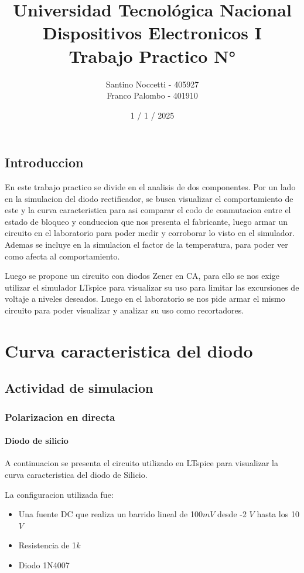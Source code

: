 \documentclass[chaptersright]{informeutn}
\title{%
\setlength{\headwidth}{\textwidth} %
\setlength{\headheight}{15pt}  %
\setlength{\headsep}{10pt}     %
  \fontsize{25}{0}\selectfont Universidad Tecnológica Nacional \\
  \fontsize{22}{30}\selectfont Dispositivos Electronicos I \\
  \fontsize{20}{25}\selectfont Trabajo Practico N°
}
\author{
  Santino Noccetti - 405927\\
  Franco Palombo - 401910\\
}
\date{1 / 1 / 2025}
\begin{document}
  \maketitle

  \myemptypage

  \tableofcontents
  \setcounter{page}{1}
  \thispagestyle{plain}

  \myemptypage

  \chapter{Introduccion}
    En este trabajo practico se divide en el analisis de dos componentes. Por un lado en la simulacion del diodo rectificador, se busca visualizar el comportamiento de este y la curva caracteristica para asi comparar el codo de conmutacion entre el estado de bloqueo y conduccion que nos presenta el fabricante, luego armar un circuito en el laboratorio para poder medir y corroborar lo visto en el simulador. Ademas se incluye en la simulacion el factor de la temperatura, para poder ver como afecta al comportamiento.

    
    Luego se propone un circuito con diodos Zener en CA, para ello se nos exige utilizar el simulador LTspice para visualizar su uso para limitar las excursiones de voltaje a niveles deseados. Luego en el laboratorio se nos pide armar el mismo circuito para poder visualizar y analizar su uso como recortadores.
  \part{Curva caracteristica del diodo}
    \chapter{Actividad de simulacion}
        \section{Polarizacion en directa}
            \subsection{Diodo de silicio}
                A continuacion se presenta el circuito utilizado en LTspice para visualizar la curva caracteristica del diodo de Silicio.
    
    
                La configuracion utilizada fue:
                \begin{itemize}
                    \item Una fuente DC que realiza un barrido lineal de 100$mV$ desde -2 $V$ hasta los 10 $V$ 
                    \item Resistencia de 1$k$
                    \item Diodo 1N4007
                \end{itemize}
    
\end{document}

